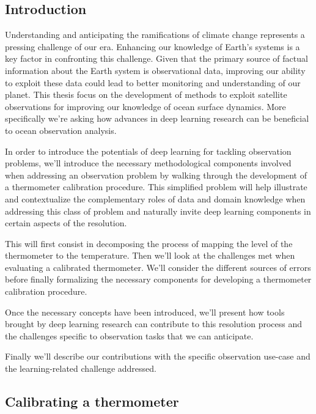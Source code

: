 \begin{bibunit}

\chapter*{Introduction}

Understanding and anticipating the ramifications of climate change represents a pressing challenge of our era.
Enhancing our knowledge of Earth's systems is a key factor in confronting this challenge.
  Given that the primary source of factual information about the Earth system is observational data, improving our ability to exploit these data could lead to better monitoring and understanding of our planet.
  This thesis focus on the development of methods to exploit satellite observations for improving our knowledge of ocean surface dynamics. 
  More specifically we're asking how advances in deep learning research can be beneficial to ocean observation analysis.
  
  In order to introduce the potentials of deep learning for tackling observation problems, we'll introduce the necessary methodological components involved when addressing an observation problem by walking through the development of a thermometer calibration procedure. This simplified problem will help illustrate and contextualize the complementary roles of data and domain knowledge when addressing this class of problem and naturally invite deep learning components in certain aspects of the resolution. 
  
  This will first consist in decomposing the process of mapping the level of the thermometer to the temperature. Then we'll look at the challenges met when evaluating a calibrated thermometer. We'll consider the different sources of errors before finally formalizing the necessary components for developing a thermometer calibration procedure.

  Once the necessary concepts have been introduced, we'll present how tools brought by deep learning research can contribute to this resolution process and the challenges specific to observation tasks that we can anticipate.

  Finally we'll describe our contributions with the specific observation use-case and the learning-related challenge addressed. 
  
  \section{Calibrating a thermometer}

\end{bibunit}
